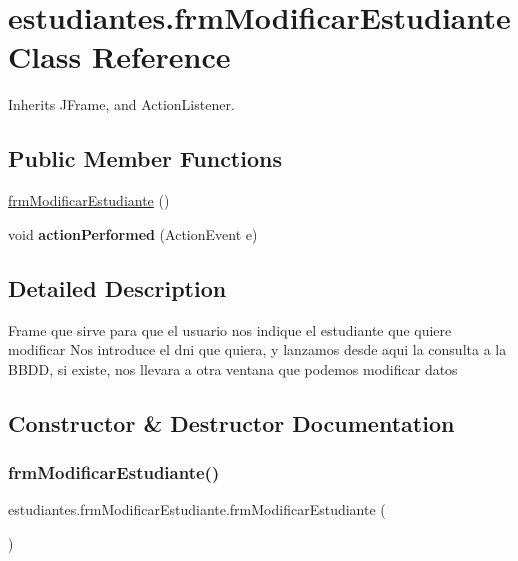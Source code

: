 \hypertarget{classestudiantes_1_1frm_modificar_estudiante}{}\section{estudiantes.\+frm\+Modificar\+Estudiante Class Reference}
\label{classestudiantes_1_1frm_modificar_estudiante}


Inherits J\+Frame, and Action\+Listener.

\subsection*{Public Member Functions}
\begin{DoxyCompactItemize}
\item 
\hyperlink{classestudiantes_1_1frm_modificar_estudiante_a840c6eec37dd77a4cb1d38e3e3627f4c}{frm\+Modificar\+Estudiante} ()
\item 
\mbox{\label{classestudiantes_1_1frm_modificar_estudiante_a13ed486722839208f546f7780ef9dea3}} 
void {\bfseries action\+Performed} (Action\+Event e)
\end{DoxyCompactItemize}


\subsection{Detailed Description}
Frame que sirve para que el usuario nos indique el estudiante que quiere modificar Nos introduce el dni que quiera, y lanzamos desde aqui la consulta a la B\+B\+DD, si existe, nos llevara a otra ventana que podemos modificar datos 

\subsection{Constructor \& Destructor Documentation}
\mbox{\label{classestudiantes_1_1frm_modificar_estudiante_a840c6eec37dd77a4cb1d38e3e3627f4c}} 
\subsubsection{\texorpdfstring{frm\+Modificar\+Estudiante()}{frmModificarEstudiante()}}
{\footnotesize\ttfamily estudiantes.\+frm\+Modificar\+Estudiante.\+frm\+Modificar\+Estudiante (\begin{DoxyParamCaption}{ }\end{DoxyParamCaption})}

